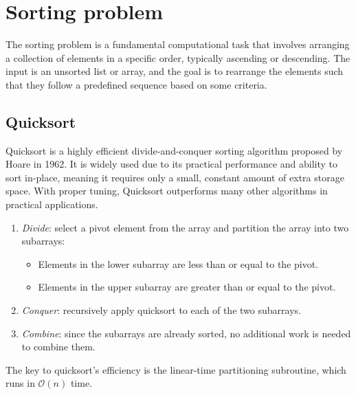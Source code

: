 \section{Sorting problem}

The sorting problem is a fundamental computational task that involves arranging a collection of elements in a specific order, typically ascending or descending. 
The input is an unsorted list or array, and the goal is to rearrange the elements such that they follow a predefined sequence based on some criteria.

\subsection{Quicksort}
Quicksort is a highly efficient divide-and-conquer sorting algorithm proposed by Hoare in 1962. 
It is widely used due to its practical performance and ability to sort in-place, meaning it requires only a small, constant amount of extra storage space. 
With proper tuning, Quicksort outperforms many other algorithms in practical applications.
\begin{enumerate}
    \item \textit{Divide}: select a pivot element from the array and partition the array into two subarrays:
        \begin{itemize}
            \item Elements in the lower subarray are less than or equal to the pivot.
            \item Elements in the upper subarray are greater than or equal to the pivot.
        \end{itemize}
    \item \textit{Conquer}: recursively apply quicksort to each of the two subarrays.
    \item \textit{Combine}: since the subarrays are already sorted, no additional work is needed to combine them.
\end{enumerate}
The key to quicksort's efficiency is the linear-time partitioning subroutine, which runs in $\mathcal{O}(n)$ time. 

